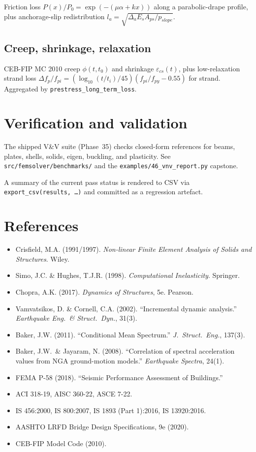 \documentclass[11pt,a4paper]{report}
\begin{document}
Friction loss $P(x) / P_0 = \exp\!\left(-(\mu \alpha + k x)\right)$
along a parabolic-drape profile, plus anchorage-slip redistribution
$l_a = \sqrt{\Delta_a E_s A_{ps} / p_{slope}}$.

\section{Creep, shrinkage, relaxation}

CEB-FIP MC 2010 creep $\phi(t, t_0)$ and shrinkage $\varepsilon_{cs}(t)$,
plus low-relaxation strand loss
$\Delta f_p / f_{pi} = (\log_{10}(t/t_i) / 45)(f_{pi}/f_{py} - 0.55)$
for strand.  Aggregated by \texttt{prestress\_long\_term\_loss}.

\chapter{Verification and validation}
\label{ch:vv}

The shipped V\&V suite (Phase~35) checks closed-form references for
beams, plates, shells, solids, eigen, buckling, and plasticity.  See
\texttt{src/femsolver/benchmarks/} and the
\texttt{examples/46\_vnv\_report.py} capstone.

A summary of the current pass status is rendered to CSV via
\texttt{export\_csv(results, \dots)} and committed as a regression
artefact.

\chapter*{References}

\begin{itemize}
  \item Crisfield, M.A. (1991/1997). \emph{Non-linear Finite Element
        Analysis of Solids and Structures}. Wiley.
  \item Simo, J.C. \& Hughes, T.J.R. (1998). \emph{Computational
        Inelasticity}. Springer.
  \item Chopra, A.K. (2017). \emph{Dynamics of Structures}, 5e.
        Pearson.
  \item Vamvatsikos, D. \& Cornell, C.A. (2002). ``Incremental dynamic
        analysis.'' \emph{Earthquake Eng.\ \& Struct.\ Dyn.}, 31(3).
  \item Baker, J.W. (2011). ``Conditional Mean Spectrum.''
        \emph{J.\ Struct.\ Eng.}, 137(3).
  \item Baker, J.W.\ \& Jayaram, N. (2008). ``Correlation of spectral
        acceleration values from NGA ground-motion models.''
        \emph{Earthquake Spectra}, 24(1).
  \item FEMA P-58 (2018). ``Seismic Performance Assessment of
        Buildings.''
  \item ACI 318-19, AISC 360-22, ASCE 7-22.
  \item IS 456:2000, IS 800:2007, IS 1893 (Part 1):2016, IS 13920:2016.
  \item AASHTO LRFD Bridge Design Specifications, 9e (2020).
  \item CEB-FIP Model Code (2010).
\end{itemize}
\end{document}
